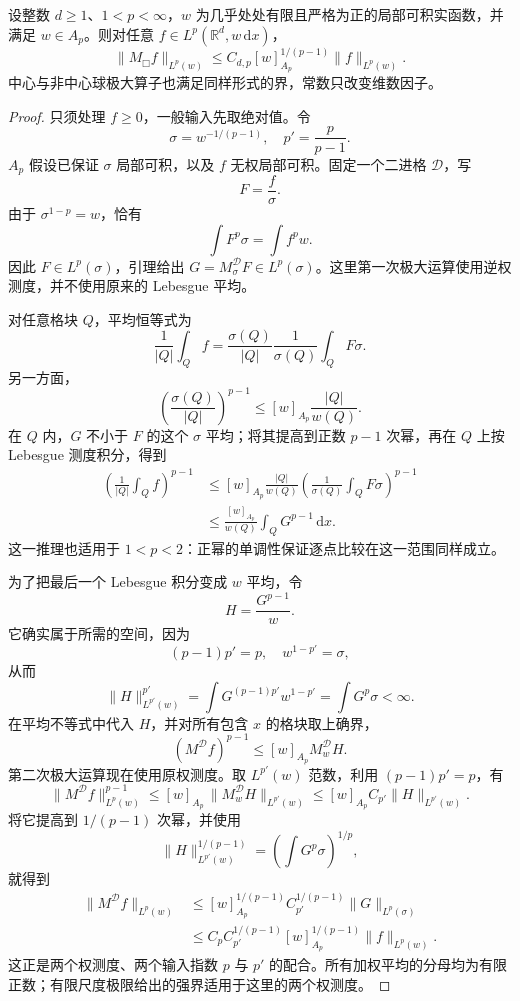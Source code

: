 \begin{theorem}[加权极大函数界]
\label{b2:thm:C-ap-maximal}
设整数 \(d\geq1\)、\(1<p<\infty\)，\(w\) 为几乎处处有限且严格为正的局部可积实函数，并满足 \(w\in A_p\)。则对任意
\(f\in L^p(\mathbb R^d,w\,\mathrm dx)\)，
\[
 \|M_\mdlgwhtsquare f\|_{L^p(w)}
       \leq C_{d,p}[w]_{A_p}^{1/(p-1)}
             \|f\|_{L^p(w)}.
\]
中心与非中心球极大算子也满足同样形式的界，常数只改变维数因子。
\end{theorem}
\begin{proof}
只须处理 \(f\geq0\)，一般输入先取绝对值。令
\[
 \sigma=w^{-1/(p-1)},\quad p'=\frac p{p-1}.
\]
\(A_p\) 假设已保证 \(\sigma\) 局部可积，以及
\(f\) 无权局部可积。固定一个二进格 \(\mathcal D\)，写
\[
 F=\frac f\sigma.
\]
由于 \(\sigma^{1-p}=w\)，恰有
\[
 \int F^p\sigma=\int f^pw.
\]
因此 \(F\in L^p(\sigma)\)，引理给出
\(G=M_\sigma^{\mathcal D}F\in L^p(\sigma)\)。这里第一次极大运算使用逆权测度，并不使用原来的 Lebesgue 平均。

对任意格块 \(Q\)，平均恒等式为
\[
 \frac1{|Q|}\int_Qf
       =\frac{\sigma(Q)}{|Q|}
          \frac1{\sigma(Q)}\int_QF\sigma.
\]
另一方面，
\[
 \left(\frac{\sigma(Q)}{|Q|}\right)^{p-1}
       \leq[w]_{A_p}\frac{|Q|}{w(Q)}.
\]
在 \(Q\) 内，\(G\) 不小于 \(F\) 的这个 \(\sigma\) 平均；将其提高到正数 \(p-1\) 次幂，再在 \(Q\) 上按 Lebesgue 测度积分，得到
\[
 \begin{aligned}
 \left(\frac1{|Q|}\int_Qf\right)^{p-1}
 &\leq[w]_{A_p}\frac{|Q|}{w(Q)}
       \left(\frac1{\sigma(Q)}\int_QF\sigma\right)^{p-1}\\
 &\leq\frac{[w]_{A_p}}{w(Q)}
       \int_QG^{p-1}\,\mathrm dx.
 \end{aligned}
\]
这一推理也适用于 \(1<p<2\)：正幂的单调性保证逐点比较在这一范围同样成立。

为了把最后一个 Lebesgue 积分变成 \(w\) 平均，令
\[
 H=\frac{G^{p-1}}w.
\]
它确实属于所需的空间，因为
\[
 (p-1)p'=p,\quad w^{1-p'}=\sigma,
\]
从而
\[
 \|H\|_{L^{p'}(w)}^{p'}
       =\int G^{(p-1)p'}w^{1-p'}
       =\int G^p\sigma<\infty.
\]
在平均不等式中代入 \(H\)，并对所有包含 \(x\) 的格块取上确界，
\[
 (M^{\mathcal D}f)^{p-1}
       \leq[w]_{A_p}M_w^{\mathcal D}H.
\]
第二次极大运算现在使用原权测度。取 \(L^{p'}(w)\) 范数，利用
\((p-1)p'=p\)，有
\[
 \|M^{\mathcal D}f\|_{L^p(w)}^{p-1}
 \leq[w]_{A_p}\,
       \|M_w^{\mathcal D}H\|_{L^{p'}(w)}
 \leq[w]_{A_p}C_{p'}\|H\|_{L^{p'}(w)}.
\]
将它提高到 \(1/(p-1)\) 次幂，并使用
\[
 \|H\|_{L^{p'}(w)}^{1/(p-1)}
       =\left(\int G^p\sigma\right)^{1/p},
\]
就得到
\[
 \begin{aligned}
 \|M^{\mathcal D}f\|_{L^p(w)}
 &\leq[w]_{A_p}^{1/(p-1)}
       C_{p'}^{1/(p-1)}\|G\|_{L^p(\sigma)}\\
 &\leq C_pC_{p'}^{1/(p-1)}
       [w]_{A_p}^{1/(p-1)}\|f\|_{L^p(w)}.
 \end{aligned}
\]
这正是两个权测度、两个输入指数 \(p\) 与 \(p'\) 的配合。所有加权平均的分母均为有限正数；有限尺度极限给出的强界适用于这里的两个权测度。


\end{proof}
